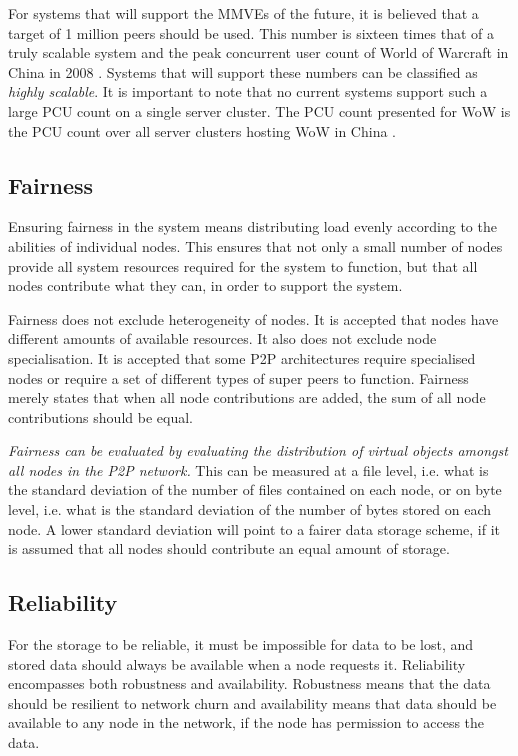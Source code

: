 For systems that will support the MMVEs of the future, it is believed that a target of 1 million peers should be used. This number is sixteen times that of a truly scalable system and the peak concurrent user count of World of Warcraft in China in 2008 \cite{WoW_china_pcu}. Systems that will support these numbers can be classified as \emph{highly scalable}. It is important to note that no current systems support such a large PCU count on a single server cluster. The PCU count presented for WoW is the PCU count over all server clusters hosting WoW in China \cite{WoW_china_pcu}.

\subsection{Fairness}
\label{fairness_requirement}

Ensuring fairness in the system means distributing load evenly according to the abilities of individual nodes. This ensures that not only a small number of nodes provide all system resources required for the system to function, but that all nodes contribute what they can, in order to support the system.

Fairness does not exclude heterogeneity of nodes. It is accepted that nodes have different amounts of available resources. It also does not exclude node specialisation. It is accepted that some P2P architectures require specialised nodes or require a set of different types of super peers to function. Fairness merely states that when all node contributions are added, the sum of all node contributions should be equal.

\emph{Fairness can be evaluated by evaluating the distribution of virtual objects amongst all nodes in the P2P network.} This can be measured at a file level, i.e. what is the standard deviation of the number of files contained on each node, or on byte level, i.e. what is the standard deviation of the number of bytes stored on each node. A lower standard deviation will point to a fairer data storage scheme, if it is assumed that all nodes should contribute an equal amount of storage.

\subsection{Reliability}

For the storage to be reliable, it must be impossible for data to be lost, and stored data should always be available when a node requests it. Reliability encompasses both robustness and availability. Robustness means that the data should be resilient to network churn and availability means that data should be available to any node in the network, if the node has permission to access the data.

